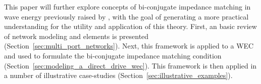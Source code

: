 \documentclass[lettersize,journal]{IEEEtran}
\newcommand{\rc}[1]{\textcolor{red}{#1}}
\begin{document}
This paper will further explore concepts of bi-conjugate impedance matching in wave energy previously raised by \cite{Bacelli:2021aa}, with the goal of generating a more practical understanding for the utility and application of this theory.
First, an basic review of network modeling and elements is presented (Section~\ref{sec:multi_port_networks}).
Next, this framework is applied to a WEC and used to formulate the bi-conjugate impedance matching condition (Section~\ref{sec:modeling_a_direct_drive_wec}).
This framework is then applied in a number of illustrative case-studies (Section~\ref{sec:illustrative_examples}).






\end{document}
